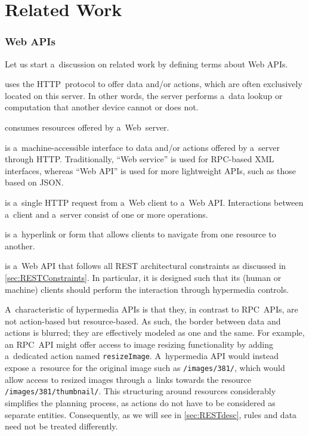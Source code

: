 \section{Related Work}
\label{sec:RelatedWork}

\subsubsection{Web APIs}
Let us start a~discussion on related work by defining terms about Web APIs.

\begin{description}\label{api}
  \item[A~Web server] uses the HTTP~protocol
    to offer data and/or actions,
    which are often exclusively located on this server.
    In other words, the server performs a~data lookup or computation
    that another device cannot or does not.
  \item[A~Web client] consumes resources offered by a~Web~server.
  \item[A~Web service or Web API] is a~machine-accessible interface
    to data and/or actions offered by a~server through HTTP.
    Traditionally, \enquote{Web service} is used for RPC-based XML interfaces,
    whereas \enquote{Web API} is used for more lightweight APIs,
    such as those based on JSON.
  \item[A~Web API operation]
    is a~single HTTP request from a~Web client to a~Web API.
    Interactions between a~client and a~server consist of one or more operations.
  \item[A~hypermedia control] is a~hyperlink or form
    that allows clients to navigate from one resource to another.
  \item[A~hypermedia API] is a~Web API
    that follows all REST architectural constraints
    as discussed in \cref{sec:RESTConstraints}.
    In particular, it is designed such that its (human or machine) clients
    should perform the interaction through hypermedia controls.
\end{description}

A~characteristic of hypermedia APIs is that they,
in contrast to RPC~APIs,
are not action-based but resource-based.
As such, the border between data and actions is blurred;
they are effectively modeled as one and the same.
For example, an RPC~API might offer access to image resizing functionality
by adding a~dedicated action named \verb!resizeImage!.
A~hypermedia API would instead expose a~resource for the original image
such as \verb!/images/381/!,
which would allow access to resized images
through a~links towards the resource \verb!/images/381/thumbnail/!.
This structuring around resources
considerably simplifies the planning process,
as actions do not have to be considered as separate entities.
Consequently, as we will see in \cref{sec:RESTdesc},
rules and data need not be treated differently.

